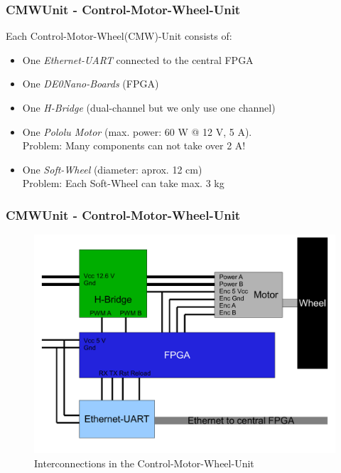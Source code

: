 \documentclass{beamer}
\begin{document}
\begin{frame}
	\frametitle{CMWUnit - Control-Motor-Wheel-Unit}
	Each Control-Motor-Wheel(CMW)-Unit consists of:
	\begin{itemize}	
		\item One \textit{Ethernet-UART} connected to the central FPGA
	
		\item One \textit{DE0Nano-Boards} (FPGA)
		
		\item One \textit{H-Bridge}	(dual-channel but we only use one channel)
	
		\item One \textit{Pololu Motor} (max. power: 60 W @ 12 V, 5 A).\\
		Problem: Many components can not take over 2 A! 
		
		\item One \textit{Soft-Wheel} (diameter: aprox. 12 cm)\\
		Problem: Each Soft-Wheel can take max. 3 kg 
	\end{itemize}
\end{frame}

\begin{frame}
	\frametitle{CMWUnit - Control-Motor-Wheel-Unit}
	\begin{figure}
	\includegraphics[scale=0.5]{figures/cmwunit.pdf}
	\caption{Interconnections in the Control-Motor-Wheel-Unit}
	\end{figure}
\end{frame}
\end{document}
